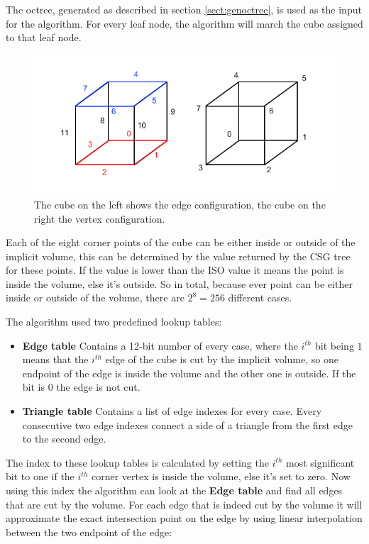 \documentclass[a4paper,10pt,twoside]{report}
\begin{document}
The octree, generated as described in section \ref{sect:genoctree}, is used as the input for the algorithm. For every leaf node, the algorithm will march the cube assigned to that leaf node. 

    \begin{figure}[h]
        \begin{center}
            \includegraphics[scale=0.6]{./images/cube_config}
        \end{center}
        \caption{The cube on the left shows the edge configuration, the cube on the right the vertex configuration.}
        \label{figure:cube_config}
    \end{figure}
    
Each of the eight corner points of the cube can be either inside or outside of the implicit volume, this can be determined by the value returned by the CSG tree for these points. If the value is lower than the ISO value it means the point is inside the volume, else it's outside. So in total, because ever point can be either inside or outside of the volume, there are $2^8 = 256$ different cases.

The algorithm used two predefined lookup tables:

\begin{itemize}
    \item[] \textbf{Edge table} Contains a 12-bit number of every case, where the $i^{th}$ bit being $1$ means that the $i^{th}$ edge of the cube is cut by the implicit volume, so one endpoint of the edge is inside the volume and the other one is outside. If the bit is $0$ the edge is not cut.
    \item[] \textbf{Triangle table} Contains a list of edge indexes for every case. Every consecutive two edge indexes connect a side of a triangle from the first edge to the second edge.
\end{itemize}

The index to these lookup tables is calculated by setting the $i^{th}$ most significant bit to one if the $i^{th}$ corner vertex is inside the volume, else it's set to zero. Now using this index the algorithm can look at the \textbf{Edge table} and find all edges that are cut by the volume. For each edge that is indeed cut by the volume it will approximate the exact intersection point on the edge by using linear interpolation between the two endpoint of the edge:
\end{document}
